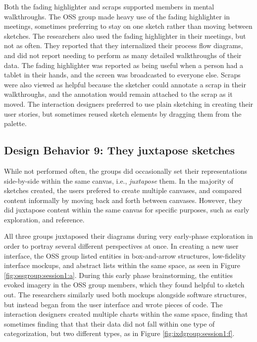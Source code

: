 Both the fading highlighter and scraps supported members in mental walkthroughs. The OSS group made heavy use of the fading highlighter in meetings, sometimes preferring to stay on one sketch rather than moving between sketches. The researchers also used the fading highlighter in their meetings, but not as often. They reported that they internalized their process flow diagrams, and did not report needing to perform as many detailed walkthroughs of their data. The fading highlighter was reported as being useful when a person had a tablet in their hands, and the screen was broadcasted to everyone else. Scraps were also viewed as helpful because the sketcher could annotate a scrap in their walkthroughs, and the annotation would remain attached to the scrap as it moved. The interaction designers preferred to use plain sketching in creating their user stories, but sometimes reused sketch elements by dragging them from the palette.

\subsection{Design Behavior 9: They juxtapose sketches}

While not performed often, the groups did occasionally set their representations side-by-side within the same canvas, i.e., \textit{juxtapose} them. In the majority of sketches created, the users prefered to create multiple canvases, and compared content informally by moving back and forth between canvases. However, they did juxtapose content within the same canvas for specific purposes, such as early exploration, and reference.

All three groups juxtaposed their diagrams during very early-phase exploration in order to portray several different perspectives at once. In creating a new user interface, the OSS group listed entities in box-and-arrow structures, low-fidelity interface mockups, and abstract lists within the same space, as seen in Figure \ref{fig:ossgroup:session1:a}. During this early phase brainstorming, the entities evoked imagery in the OSS group members, which they found helpful to sketch out. The researchers similarly used both mockups alongside software structures, but instead began from the user interface and wrote pieces of code. The interaction designers created multiple charts within the same space, finding that sometimes finding that that their data did not fall within one type of categorization, but two different types, as in Figure \ref{fig:ixdgroup:session1:f}. 

